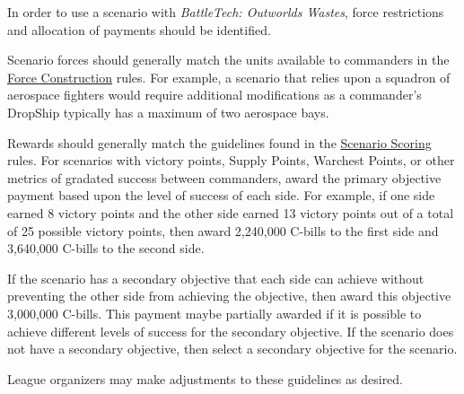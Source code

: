 In order to use a scenario with \emph{BattleTech: Outworlds Wastes}, force restrictions and allocation of payments should be identified.

Scenario forces should generally match the units available to commanders in the \hyperref[subsec:force_construction]{Force Construction} rules.
For example, a scenario that relies upon a squadron of aerospace fighters would require additional modifications as a commander's DropShip typically has a maximum of two aerospace bays.

Rewards should generally match the guidelines found in the \hyperref[subsec:scenario_scoring]{Scenario Scoring} rules.
For scenarios with victory points, Supply Points, Warchest Points, or other metrics of gradated success between commanders, award the primary objective payment based upon the level of success of each side.
For example, if one side earned 8 victory points and the other side earned 13 victory points out of a total of 25 possible victory points, then award 2,240,000 C-bills to the first side and 3,640,000 C-bills to the second side.

If the scenario has a secondary objective that each side can achieve without preventing the other side from achieving the objective, then award this objective 3,000,000 C-bills.
This payment maybe partially awarded if it is possible to achieve different levels of success for the secondary objective.
If the scenario does not have a secondary objective, then select a secondary objective for the scenario.

League organizers may make adjustments to these guidelines as desired.
